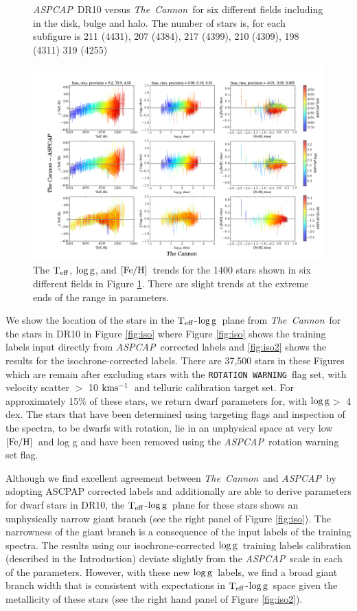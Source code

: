 \documentclass[12pt, preprint]{aastex}
\newcommand{\teff}{\mbox{$\rm T_{eff}$}}
\newcommand{\kms}{\mbox{$\rm kms^{-1}$}}
\newcommand{\feh}{\mbox{$\rm [Fe/H]$}}
\newcommand{\logg}{\mbox{$\rm \log g$}}
\newcommand{\tc}{\textsl{The~Cannon}}
\newcommand{\aspcap}{\textsl{ASPCAP}}
\newcommand{\rotwarn}{\texttt{ROTATION WARNING}}
\begin{document}
\begin{figure}[!h]
\caption{\small{\aspcap\ DR10 versus \tc\ for six different fields including in the disk, bulge and halo. The number of stars is, for each subfigure is 211 (4431), 207 (4384), 217 (4399), 210 (4309), 198 (4311) 319 (4255) }}
\label{fig:cal}
\end{figure}

\begin{figure}[!h]
\centering
        \includegraphics[scale=0.35]{./plots/cplot2.png} 
\caption{The \teff, \logg, and \feh\ trends for the 1400 stars shown in six different fields in Figure \ref{fig:cal}. There are slight trends at the extreme ends of the range in parameters.}
\label{fig:cplot}
\end{figure}


We show the location of the stars in the \teff-\logg\ plane from \tc\ for the stars in DR10 in Figure \ref{fig:iso} where Figure \ref{fig:iso} shows the training labels input directly from \aspcap\ corrected labels and \ref{fig:iso2} shows the results for the isochrone-corrected labels. There are 37,500 stars in these Figures which are remain after excluding stars with the \rotwarn\ flag set, with velocity scatter $>$ 10 \kms\ and telluric calibration target set. For approximately 15\% of these stars, we return dwarf parameters for, with \logg $>$ 4 dex.  The stars that have been determined using targeting flags and inspection of the spectra, to be dwarfs with rotation, lie in an unphysical space at very low \feh\ and log g and have been removed using the \aspcap\ rotation warning set flag. 

Although we find excellent agreement between \tc\ and \aspcap\ by adopting ASCPAP corrected labels and additionally are able to derive parameters for dwarf stars in DR10, the \teff-\logg\ plane for these stars shows an unphysically narrow giant branch  (see the right panel of Figure \ref{fig:iso}). The narrowness of the giant branch is a consequence of the input labels of the training spectra. The results using our isochrone-corrected \logg\ training labels calibration (described in the Introduction) deviate slightly   from the \aspcap\ scale in each of the parameters. However, with these new \logg\ labels, we find a broad giant branch width that is consistent with expectations in \teff-\logg\ space given the metallicity of these stars (see the right hand panel of Figure \ref{fig:iso2}). 
\end{document}
